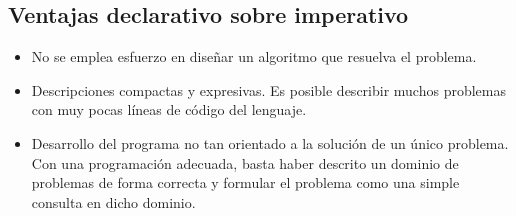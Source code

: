 \subsection{Ventajas declarativo sobre imperativo}
\begin{itemize}
\item No se emplea esfuerzo en diseñar un algoritmo que resuelva el problema.
\item Descripciones compactas y expresivas. Es posible describir muchos problemas con muy pocas líneas de código del lenguaje.
\item Desarrollo del programa no tan orientado a la solución de un único problema. Con una programación adecuada, basta haber descrito un dominio de problemas de forma correcta y formular el problema como una simple consulta en dicho dominio.
\end{itemize}